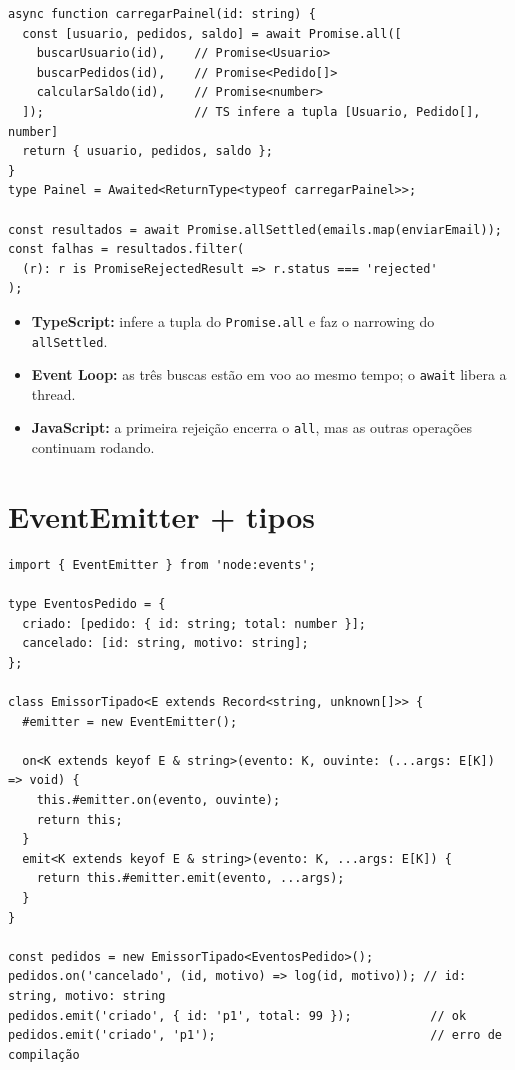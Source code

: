 \documentclass[12pt,a4paper,oneside]{book}
\newcommand{\code}[1]{\texttt{#1}}
\begin{document}
\begin{verbatim}
async function carregarPainel(id: string) {
  const [usuario, pedidos, saldo] = await Promise.all([
    buscarUsuario(id),    // Promise<Usuario>
    buscarPedidos(id),    // Promise<Pedido[]>
    calcularSaldo(id),    // Promise<number>
  ]);                     // TS infere a tupla [Usuario, Pedido[], number]
  return { usuario, pedidos, saldo };
}
type Painel = Awaited<ReturnType<typeof carregarPainel>>;

const resultados = await Promise.allSettled(emails.map(enviarEmail));
const falhas = resultados.filter(
  (r): r is PromiseRejectedResult => r.status === 'rejected'
);
\end{verbatim}

\begin{itemize}
  \item \textbf{TypeScript:} infere a tupla do \code{Promise.all} e faz o narrowing do \code{allSettled}.
  \item \textbf{Event Loop:} as três buscas estão em voo ao mesmo tempo; o \code{await} libera a thread.
  \item \textbf{JavaScript:} a primeira rejeição encerra o \code{all}, mas as outras operações continuam rodando.
\end{itemize}

\section{EventEmitter + tipos}

\begin{verbatim}
import { EventEmitter } from 'node:events';

type EventosPedido = {
  criado: [pedido: { id: string; total: number }];
  cancelado: [id: string, motivo: string];
};

class EmissorTipado<E extends Record<string, unknown[]>> {
  #emitter = new EventEmitter();

  on<K extends keyof E & string>(evento: K, ouvinte: (...args: E[K]) => void) {
    this.#emitter.on(evento, ouvinte);
    return this;
  }
  emit<K extends keyof E & string>(evento: K, ...args: E[K]) {
    return this.#emitter.emit(evento, ...args);
  }
}

const pedidos = new EmissorTipado<EventosPedido>();
pedidos.on('cancelado', (id, motivo) => log(id, motivo)); // id: string, motivo: string
pedidos.emit('criado', { id: 'p1', total: 99 });           // ok
pedidos.emit('criado', 'p1');                              // erro de compilação
\end{verbatim}
\end{document}
